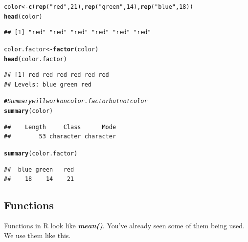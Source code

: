 \documentclass[draft]{article}\usepackage[]{graphicx}\usepackage[]{color}
\makeatletter
\newcommand{\hlnum}[1]{\textcolor[rgb]{0.686,0.059,0.569}{#1}}%
\newcommand{\hlstr}[1]{\textcolor[rgb]{0.192,0.494,0.8}{#1}}%
\newcommand{\hlcom}[1]{\textcolor[rgb]{0.678,0.584,0.686}{\textit{#1}}}%
\newcommand{\hlstd}[1]{\textcolor[rgb]{0.345,0.345,0.345}{#1}}%
\newcommand{\hlkwb}[1]{\textcolor[rgb]{0.69,0.353,0.396}{#1}}%
\newcommand{\hlkwd}[1]{\textcolor[rgb]{0.737,0.353,0.396}{\textbf{#1}}}%
\newenvironment{kframe}{%
 \def\at@end@of@kframe{}%
 \ifinner\ifhmode%
  \def\at@end@of@kframe{\end{minipage}}%
  \begin{minipage}{\columnwidth}%
 \fi\fi%
 \def\FrameCommand##1{\hskip\@totalleftmargin \hskip-\fboxsep
 \colorbox{shadecolor}{##1}\hskip-\fboxsep
     \hskip-\linewidth \hskip-\@totalleftmargin \hskip\columnwidth}%
 \MakeFramed {\advance\hsize-\width
   \@totalleftmargin\z@ \linewidth\hsize
   \@setminipage}}%
 {\par\unskip\endMakeFramed%
 \at@end@of@kframe}
\newenvironment{knitrout}{}{} %
\makeatother
\begin{document}
\begin{knitrout}
\color{fgcolor}\begin{kframe}
\begin{alltt}
  \hlstd{color} \hlkwb{<-} \hlkwd{c}\hlstd{(}\hlkwd{rep}\hlstd{(}\hlstr{"red"}\hlstd{,} \hlnum{21}\hlstd{),} \hlkwd{rep}\hlstd{(}\hlstr{"green"}\hlstd{,} \hlnum{14}\hlstd{),} \hlkwd{rep}\hlstd{(}\hlstr{"blue"}\hlstd{,} \hlnum{18}\hlstd{))}
  \hlkwd{head}\hlstd{(color)}
\end{alltt}
\begin{verbatim}
## [1] "red" "red" "red" "red" "red" "red"
\end{verbatim}
\begin{alltt}
  \hlstd{color.factor} \hlkwb{<-} \hlkwd{factor}\hlstd{(color)}
  \hlkwd{head}\hlstd{(color.factor)}
\end{alltt}
\begin{verbatim}
## [1] red red red red red red
## Levels: blue green red
\end{verbatim}
\begin{alltt}
  \hlcom{# Summary will work on color.factor but not color}
  \hlkwd{summary}\hlstd{(color)}
\end{alltt}
\begin{verbatim}
##    Length     Class      Mode 
##        53 character character
\end{verbatim}
\begin{alltt}
  \hlkwd{summary}\hlstd{(color.factor)}
\end{alltt}
\begin{verbatim}
##  blue green   red 
##    18    14    21
\end{verbatim}
\end{kframe}
\end{knitrout}
    
    
  \subsection*{Functions}
  Functions in R look like \textbf{\textit{mean()}}. You've already seen some 
  of them being used. We use them like this.
  
\end{document}
